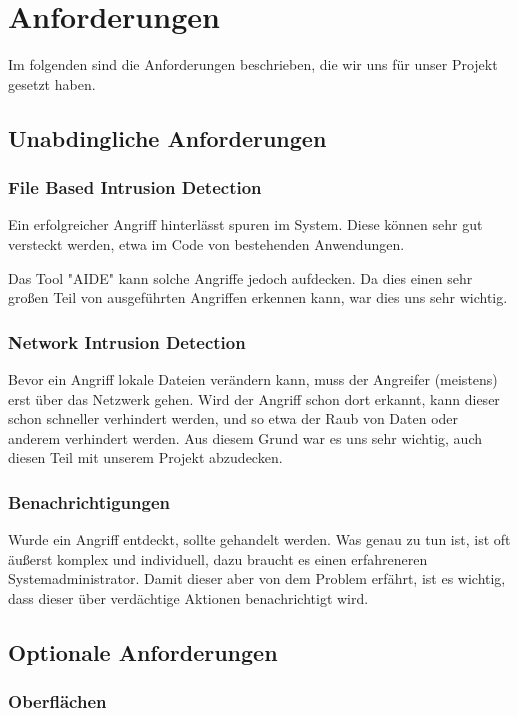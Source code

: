 \documentclass{article}
\begin{document}
\section{Anforderungen}
Im folgenden sind die Anforderungen beschrieben, die wir uns für unser Projekt gesetzt haben.

\subsection{Unabdingliche Anforderungen}
\subsubsection{File Based Intrusion Detection}
Ein erfolgreicher Angriff hinterlässt spuren im System. Diese können sehr gut versteckt werden, etwa im Code von bestehenden Anwendungen.

Das Tool "AIDE" kann solche Angriffe jedoch aufdecken. Da dies einen sehr großen Teil von ausgeführten Angriffen erkennen kann, war dies uns sehr wichtig.

\subsubsection{Network Intrusion Detection}
Bevor ein Angriff lokale Dateien verändern kann, muss der Angreifer (meistens) erst über das Netzwerk gehen. Wird der Angriff schon dort erkannt, kann dieser schon schneller verhindert werden, und so etwa der Raub von Daten oder anderem verhindert werden. Aus diesem Grund war es uns sehr wichtig, auch diesen Teil mit unserem Projekt abzudecken.

\subsubsection{Benachrichtigungen}
Wurde ein Angriff entdeckt, sollte gehandelt werden. Was genau zu tun ist, ist oft äußerst komplex und individuell, dazu braucht es einen erfahreneren Systemadministrator. Damit dieser aber von dem Problem erfährt, ist es wichtig, dass dieser über verdächtige Aktionen benachrichtigt wird.

\vfil \break

\subsection{Optionale Anforderungen}
\subsubsection{Oberflächen}
\end{document}
